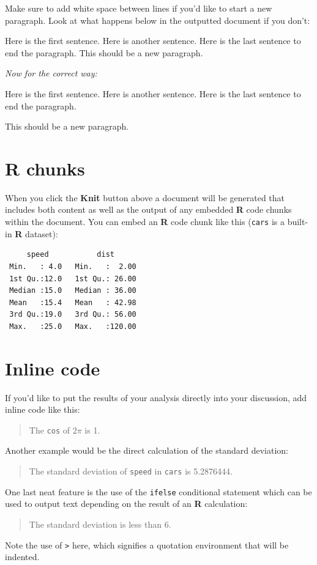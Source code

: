 \documentclass[12pt,twoside]{reedthesis}
\theoremstyle{definition}
\theoremstyle{definition}
\theoremstyle{definition}
\theoremstyle{remark}
\begin{document}
Make sure to add white space between lines if you'd like to start a new
paragraph. Look at what happens below in the outputted document if you
don't:

Here is the first sentence. Here is another sentence. Here is the last
sentence to end the paragraph. This should be a new paragraph.

\emph{Now for the correct way:}

Here is the first sentence. Here is another sentence. Here is the last
sentence to end the paragraph.

This should be a new paragraph.

\hypertarget{r-chunks}{%
\section{R chunks}\label{r-chunks}}

When you click the \textbf{Knit} button above a document will be
generated that includes both content as well as the output of any
embedded \textbf{R} code chunks within the document. You can embed an
\textbf{R} code chunk like this (\texttt{cars} is a built-in \textbf{R}
dataset):
\begin{verbatim}
     speed           dist       
 Min.   : 4.0   Min.   :  2.00  
 1st Qu.:12.0   1st Qu.: 26.00  
 Median :15.0   Median : 36.00  
 Mean   :15.4   Mean   : 42.98  
 3rd Qu.:19.0   3rd Qu.: 56.00  
 Max.   :25.0   Max.   :120.00  
\end{verbatim}
\hypertarget{inline-code}{%
\section{Inline code}\label{inline-code}}

If you'd like to put the results of your analysis directly into your
discussion, add inline code like this:
\begin{quote}
The \texttt{cos} of \(2 \pi\) is 1.
\end{quote}
Another example would be the direct calculation of the standard
deviation:
\begin{quote}
The standard deviation of \texttt{speed} in \texttt{cars} is 5.2876444.
\end{quote}
One last neat feature is the use of the \texttt{ifelse} conditional
statement which can be used to output text depending on the result of an
\textbf{R} calculation:
\begin{quote}
The standard deviation is less than 6.
\end{quote}
Note the use of \texttt{\textgreater{}} here, which signifies a
quotation environment that will be indented.
\end{document}
